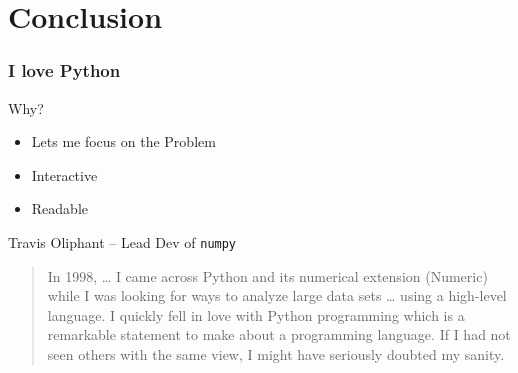 \documentclass[presentation]{beamer}
\begin{document}
\section*{Conclusion}
\label{sec-4}
\begin{frame}
\frametitle{I love Python}
\label{sec-4_1}
\begin{block}{Why?}
\label{sec-4_1_1}
\begin{itemize}

\item Lets me focus on the Problem\\
\label{sec-4_1_1_1}%
\item Interactive\\
\label{sec-4_1_1_2}%
\item Readable\\
\label{sec-4_1_1_3}%
\end{itemize} %
\end{block}
\begin{block}{Travis Oliphant -- Lead Dev of \texttt{numpy}}
\label{sec-4_1_2}

\begin{quote}
In 1998, \ldots{} I came across Python and its numerical extension
(Numeric) while I was looking for ways to analyze large data
sets \ldots{} using a high-level language. I quickly fell in love
with Python programming which is a remarkable statement to make
about a programming language. If I had not seen others with the
same view, I might have seriously doubted my sanity.
\end{quote}
\end{block}
\end{frame}
\end{document}
